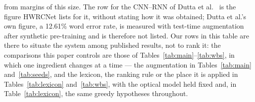\documentclass{ws-ijprai}
\begin{document}
from margins of this size. The row for the CNN--RNN of Dutta et
al.~\cite{dutta2018improving} is the figure HWRCNet lists for it, without
stating how it was obtained; Dutta et al.'s own figure, a 12.61\% word
error rate, is measured with test-time augmentation after synthetic
pre-training and is therefore not listed. Our rows in this table are there to situate
the system among published results, not to rank it: the comparisons this paper controls
are those of Tables~\ref{tab:main}--\ref{tab:wbs}, in which one ingredient
changes at a time --- the augmentation in Tables~\ref{tab:main}
and~\ref{tab:seeds}, and the lexicon, the ranking rule or the place it is
applied in Tables~\ref{tab:lexicon} and~\ref{tab:wbs}, with the optical
model held fixed and, in Table~\ref{tab:lexicon}, the same greedy
hypotheses throughout.
\end{document}
